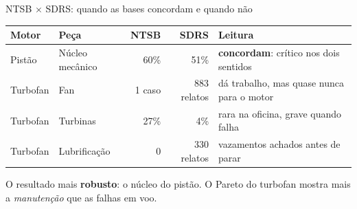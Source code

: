 \documentclass[aspectratio=169,11pt]{beamer}
\newcommand{\destaque}[1]{{\color{ieeeblue}\bfseries #1}}
\begin{document}
\begin{frame}{NTSB $\times$ SDRS: quando as bases concordam e quando não}
  \centering
  \footnotesize
  \begin{tabular}{@{}llrrl@{}}
    \toprule
    Motor & Peça & NTSB & SDRS & Leitura \\
    \midrule
    Pistão & Núcleo mecânico & 60\% & 51\% & \textcolor{bom}{\textbf{concordam}}: crítico nos dois sentidos \\
    Turbofan & Fan & 1 caso & 883 relatos & dá trabalho, mas quase nunca para o motor \\
    Turbofan & Turbinas & 27\% & 4\% & rara na oficina, grave quando falha \\
    Turbofan & Lubrificação & 0 & 330 relatos & vazamentos achados antes de parar \\
    \bottomrule
  \end{tabular}
  \vspace{4mm}

  \vspace{2mm}

  {\small O resultado mais \textbf{robusto}: o núcleo do pistão. O Pareto do turbofan mostra mais a \emph{manutenção} que as falhas em voo.\par}
\end{frame}
\end{document}
